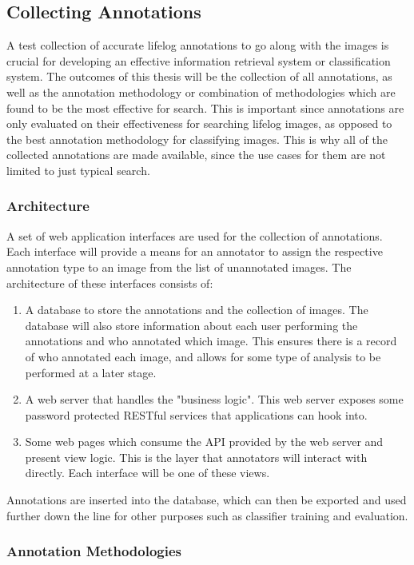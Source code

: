 \documentclass[12pt,a4paper]{article}
\begin{document}
\subsection{Collecting Annotations}

A test collection of accurate lifelog annotations to go along with the images is crucial for developing an effective information retrieval system or classification system. The outcomes of this thesis will be the collection of all annotations, as well as the annotation methodology or combination of methodologies which are found to be the most effective for search. This is important since annotations are only evaluated on their effectiveness for searching lifelog images, as opposed to the best annotation methodology for classifying images. This is why all of the collected annotations are made available, since the use cases for them are not limited to just typical search.

\subsubsection{Architecture}
A set of web application interfaces are used for the collection of annotations. Each interface will provide a means for an annotator to assign the respective annotation type to an image from the list of unannotated images. The architecture of these interfaces consists of:
\begin{enumerate}
    \item A database to store the annotations and the collection of images. The database will also store information about each user performing the annotations and who annotated which image. This ensures there is a record of who annotated each image, and allows for some type of analysis to be performed at a later stage.
    \item A web server that handles the "business logic". This web server exposes some password protected RESTful services that applications can hook into.
    \item Some web pages which consume the API provided by the web server and present view logic. This is the layer that annotators will interact with directly. Each interface will be one of these views.
\end{enumerate}

Annotations are inserted into the database, which can then be exported and used further down the line for other purposes such as  classifier training and evaluation. 

\subsubsection{Annotation Methodologies}
\end{document}
